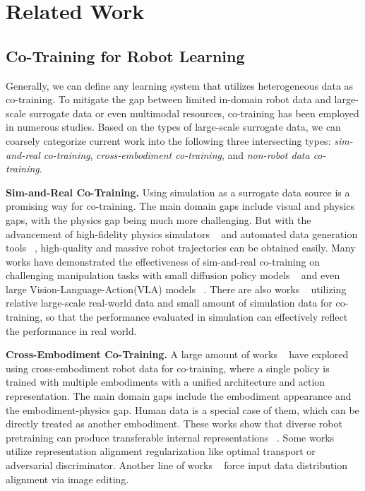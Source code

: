 \section{Related Work}

\subsection{Co-Training for Robot Learning}
Generally, we can define any learning system that utilizes heterogeneous data as co-training.
To mitigate the gap between limited in-domain robot data and large-scale surrogate data or even multimodal resources, co-training has been employed in numerous studies. 
Based on the types of large-scale surrogate data, we can coarsely categorize current work into the following three intersecting types: \textit{sim-and-real co-training}, \textit{cross-embodiment co-training}, and \textit{non-robot data co-training}.

\textbf{Sim-and-Real Co-Training.}
Using simulation as a surrogate data source is a promising way for co-training.
The main domain gaps include visual and physics gaps, with the physics gap being much more challenging.
But with the advancement of high-fidelity physics simulators ~\cite{mittal2025isaac, nasiriany2024robocasa, zakka2025mujoco, Genesis} and automated data generation tools ~\cite{mandlekar2023mimicgen, jiang2025dexmimicgen, lin2025constraint}, high-quality and massive robot trajectories can be obtained easily.
Many works have demonstrated the effectiveness of sim-and-real co-training on challenging manipulation tasks with small diffusion policy models ~\cite{maddukuri2025sim, wei2025empirical, cheng2025generalizable} and even large Vision-Language-Action(VLA) models ~\cite{bjorck2025gr00t, yu2025real2render2real}.
There are also works ~\cite{barreiros2025careful, jain2025polaris} utilizing relative large-scale real-world data and small amount of simulation data for co-training, so that the performance evaluated in simulation can effectively reflect the performance in real world.


\textbf{Cross-Embodiment Co-Training.}
A large amount of works ~\cite{doshi2024scaling, yang2024pushing, o2024open, intelligence2025pi_, yuan2025motiontrans} have explored using cross-embodiment robot data for co-training, where a single policy is trained with multiple embodiments with a unified architecture and action representation.
The main domain gaps include the embodiment appearance and the embodiment-physics gap.
Human data is a special case of them, which can be directly treated as another embodiment.
These works show that diverse robot pretraining can produce transferable internal representations ~\cite{kareer2025emergence}.
Some works ~\cite{cai2025n, kareer2025egomimic, punamiya2025egobridge} utilize representation alignment regularization like optimal transport or adversarial discriminator.
Another line of works ~\cite{xu2025dexumi, lepert2025phantom, lepert2025masquerade} force input data distribution alignment via image editing.


